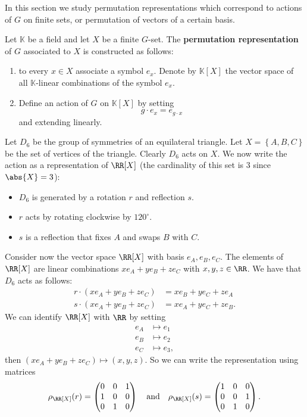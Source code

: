 \documentclass[12pt, a4paper]{article}
\newcommand{\KK}{\mathbb{K}}
\begin{document}
In this section we study permutation representations which correspond to actions of \(G\) on finite sets, or permutation of vectors of a certain basis.

\begin{definition}
    Let \(\KK\) be a field and let \(X\) be a finite \(G\)-set. The \textbf{permutation representation} of \(G\) associated to \(X\) is constructed as follows:
    \begin{enumerate}
        \item to every \(x\in X\) associate a symbol \(e_x\). Denote by \(\KK[X]\) the vector space of all \(\KK\)-linear combinations of the symbol \(e_x\).
        \item Define an action of \(G\) on \(\KK[X]\) by setting 
        \[g\cdot e_x =e_{g\cdot x}\]
        and extending linearly.
    \end{enumerate}
\end{definition}

\begin{mdexample}
    Let \(D_6\) be the group of symmetries of an equilateral triangle. Let \(X = \left\{ A,B,C \right\}\) be the set of vertices of the triangle. Clearly \(D_6\) acts on \(X\). We now write the action as a representation of \(\RR[X]\) (the cardinality of this set is \(3\) since \(\abs{X}=3\)):
    \begin{itemize}
        \item \(D_6\) is generated by a rotation \(r\) and reflection \(s\).
        \item \(r\) acts by rotating clockwise by \(120^{\circ}\).
        \item \(s\) is a reflection that fixes \(A\) and swaps \(B\) with \(C\).
    \end{itemize}
    Consider now the vector space \(\RR[X]\) with basis \(e_A,e_B,e_C\). The elements of \(\RR[X]\) are linear combinations \(xe_A+ye_B+ze_C\) with \(x,y,z\in \RR\). We have that \(D_6\) acts as follows:
    \[\begin{aligned}
        r\cdot (xe_A+ye_B+ze_C)&=xe_B +ye_C + ze_A \\
        s \cdot (xe_A+ye_B+ze_C) &= x e_A + ye_C +ze_B. 
    \end{aligned}\]
    We can identify \(\RR[X]\) with \(\RR\) by setting 
    \[\begin{aligned}
        e_A &\mapsto e_1 \\
        e_B &\mapsto e_2 \\
        e_C &\mapsto e_3, 
    \end{aligned}\]
    then \((xe_A+ye_B+ze_C) \mapsto (x,y,z)\). So we can write the representation using matrices 
    \[\rho_{\RR[X]}(r) = \begin{pmatrix} 0 & 0 & 1 \\ 1 & 0 & 0 \\0 & 1 & 0\end{pmatrix} \quad \text{and} \quad \rho_{\RR[X]}(s) =\begin{pmatrix} 1 & 0 & 0 \\ 0 & 0 & 1 \\ 0 & 1 & 0\end{pmatrix}.\]
\end{mdexample}
\end{document}
